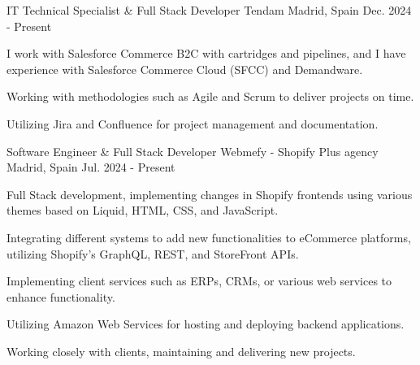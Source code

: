

\begin{cventries}

\cventry
    {IT Technical Specialist \& Full Stack Developer} %
    {Tendam} %
    {Madrid, Spain} %
    {Dec. 2024 - Present} %
    {
      \begin{cvitems} %
        \item {I work with Salesforce Commerce B2C with cartridges and pipelines, and I have experience with Salesforce Commerce Cloud (SFCC) and Demandware.}
        \item {Working with methodologies such as Agile and Scrum to deliver projects on time.}
        \item {Utilizing Jira and Confluence for project management and documentation.}
      \end{cvitems}
    }
  \vspace{5.5mm}
\cventry
    {Software Engineer \& Full Stack Developer} %
    {Webmefy - Shopify Plus agency} %
    {Madrid, Spain} %
    {Jul. 2024 - Present} %
    {
      \begin{cvitems} %
        \item {Full Stack development, implementing changes in Shopify frontends using various themes based on Liquid, HTML, CSS, and JavaScript.}
        \item {Integrating different systems to add new functionalities to eCommerce platforms, utilizing Shopify's GraphQL, REST, and StoreFront APIs.}
        \item {Implementing client services such as ERPs, CRMs, or various web services to enhance functionality.}
        \item {Utilizing Amazon Web Services for hosting and deploying backend applications.}
        \item {Working closely with clients, maintaining and delivering new projects.}

\end{cvitems}}
\end{cventries}
